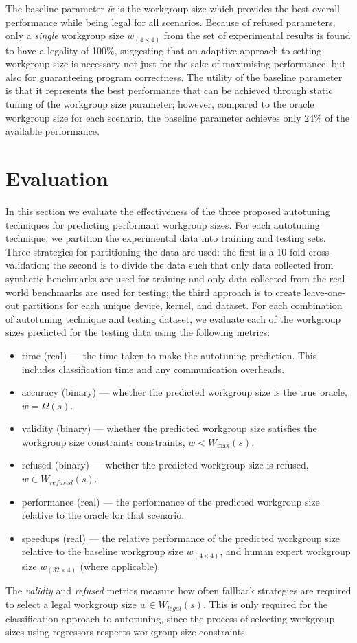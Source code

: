 \documentclass[preprint,nonatbib,10pt]{sigplanconf}
\begin{document}
The baseline parameter $\bar{w}$ is the workgroup size which provides
the best overall performance while being legal for all
scenarios. Because of refused parameters, only a \emph{single}
workgroup size $w_{(4 \times 4)}$ from the set of experimental results
is found to have a legality of 100\%, suggesting that an adaptive
approach to setting workgroup size is necessary not just for the sake
of maximising performance, but also for guaranteeing program
correctness. The utility of the baseline parameter is that it
represents the best performance that can be achieved through static
tuning of the workgroup size parameter; however, compared to the
oracle workgroup size for each scenario, the baseline parameter
achieves only 24\% of the available performance.


\section{Evaluation}\label{sec:evaluation}

In this section we evaluate the effectiveness of the three proposed
autotuning techniques for predicting performant workgroup sizes. For
each autotuning technique, we partition the experimental data into
training and testing sets. Three strategies for partitioning the data
are used: the first is a 10-fold cross-validation; the second is to
divide the data such that only data collected from synthetic
benchmarks are used for training and only data collected from the
real-world benchmarks are used for testing; the third approach is to
create leave-one-out partitions for each unique device, kernel, and
dataset. For each combination of autotuning technique and testing
dataset, we evaluate each of the workgroup sizes predicted for the
testing data using the following metrics:
%
\begin{itemize}
\item time (real) --- the time taken to make the autotuning
  prediction. This includes classification time and any communication
  overheads.
\item accuracy (binary) --- whether the predicted workgroup size is
  the true oracle, $w = \Omega(s)$.
\item validity (binary) --- whether the predicted workgroup size
  satisfies the workgroup size constraints constraints,
  $w < W_{\max}(s)$.
\item refused (binary) --- whether the predicted workgroup size is
  refused, $w \in W_{refused}(s)$.
\item performance (real) --- the performance of the predicted
  workgroup size relative to the oracle for that scenario.
\item speedups (real) --- the relative performance of the predicted
  workgroup size relative to the baseline workgroup size
  $w_{(4 \times 4)}$, and human expert workgroup size
  $w_{(32 \times 4)}$ (where applicable).
\end{itemize}
%
The \emph{validty} and \emph{refused} metrics measure how often
fallback strategies are required to select a legal workgroup size
$w \in W_{legal}(s)$. This is only required for the classification
approach to autotuning, since the process of selecting workgroup sizes
using regressors respects workgroup size constraints.
\end{document}
